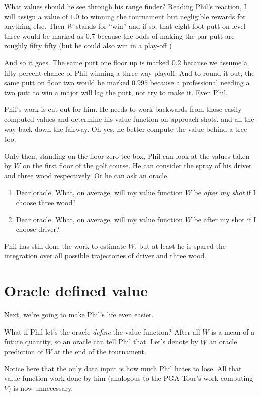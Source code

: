 What values should he see through his range finder? Reading Phil's reaction, I will assign a value of $1.0$ to winning the tournament but negligible rewards for anything else. Then $W$ stands for ``win'' and if so, that eight foot putt on level three would be marked as $0.7$ because the odds of making the par putt are roughly fifty fifty (but he could also win in a play-off.)

And so it goes. The same putt one floor up is marked $0.2$ because we assume a fifty percent chance of Phil winning a three-way playoff. And to round it out, the same putt on floor two would be marked $0.995$ because a professional needing a two putt to win a major will lag the putt, not try to make it. Even Phil. 

Phil's work is cut out for him. He needs to work backwards from those easily computed values and determine his value function on approach shots, and all the way back down the fairway. Oh yes, he better compute the value behind a tree too. 

Only then, standing on the floor zero tee box, Phil can look at the values taken by $W$ on the first floor of the golf course. He can consider the spray of his driver and three wood respectively. Or he can ask an oracle. 

\begin{enumerate}
    \item Dear oracle. What, on average, will my value function $W$ be {\em after my shot} if I choose three wood?
    \item Dear oracle. What, on average, will my value function $W$ be after my shot if I choose driver?
\end{enumerate}
Phil has still done the work to estimate $W$, but at least he is spared the integration over all possible trajectories of driver and three wood. 
 
\section{Oracle defined value}

Next, we're going to make Phil's life even easier. 

What if Phil let's the oracle {\em define} the value function? After all $W$ is a mean of a future quantity, so an oracle can tell Phil that. Let's denote by $\tilde{W}$ an oracle prediction of $W$ at the end of the tournament. 


Notice here that the only data input is how much Phil hates to lose. All that value function work done by him (analogous to the PGA Tour's work computing $V$) is now unnecessary.  


